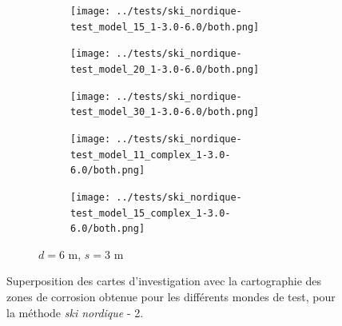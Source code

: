 \documentclass[francais,RandD]{rapportPFE}
\begin{document}
\begin{figure}[H]
\begin{subfigure}[t]{\linewidth}
				\hfill
				\begin{subfigure}[t]{0.11\linewidth}
					\texttt{[image: ../tests/ski\_nordique-test\_model\_15\_1-3.0-6.0/both.png]}
				\end{subfigure}
				\hfill
				\begin{subfigure}[t]{0.11\linewidth}
					\texttt{[image: ../tests/ski\_nordique-test\_model\_20\_1-3.0-6.0/both.png]}
				\end{subfigure}
				\hfill
				\begin{subfigure}[t]{0.11\linewidth}
					\texttt{[image: ../tests/ski\_nordique-test\_model\_30\_1-3.0-6.0/both.png]}
				\end{subfigure}
				\hfill
				\begin{subfigure}[t]{0.11\linewidth}
					\texttt{[image: ../tests/ski\_nordique-test\_model\_11\_complex\_1-3.0-6.0/both.png]}
				\end{subfigure}
				\hfill
				\begin{subfigure}[t]{0.11\linewidth}
					\texttt{[image: ../tests/ski\_nordique-test\_model\_15\_complex\_1-3.0-6.0/both.png]}
				\end{subfigure}
				\caption{$d = 6$ m, $s = 3$ m}
			\end{subfigure}
			\caption{Superposition des cartes d'investigation avec la cartographie des zones de corrosion obtenue pour les différents mondes de test, pour la méthode \textit{ski nordique} - 2.}
			\label{fig:ski_nordique_resultats_2}
		\end{figure}
\end{document}
